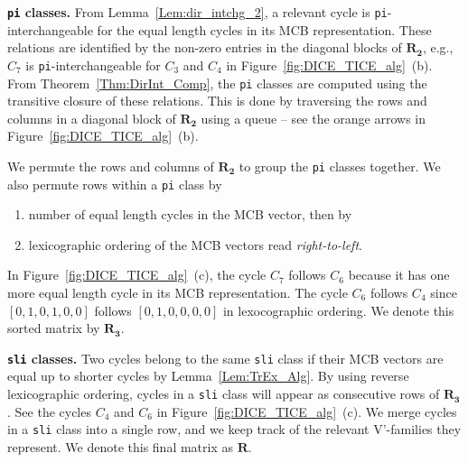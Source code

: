 \documentclass[fleqn,11pt]{article}
\begin{document}
\textbf{{\tt pi} classes.} 
From Lemma~\ref{Lem:dir_intchg_2}, a relevant cycle is {\tt pi}-interchangeable for the equal length cycles in its MCB representation. These relations are identified by the non-zero entries in the diagonal blocks of $\bm{R_2}$, e.g., $C_7$ is {\tt pi}-interchangeable for $C_3$ and $C_4$ in Figure~\ref{fig:DICE_TICE_alg}~(b).
From Theorem~\ref{Thm:DirInt_Comp}, the {\tt pi} classes are computed using the transitive closure of these relations.
This is done by traversing the rows and columns in a diagonal block of $\bm{R_2}$ using a queue -- see the orange arrows in Figure~\ref{fig:DICE_TICE_alg}~(b). %


We permute the rows and columns of $\bm{R_2}$ to group the {\tt pi} classes together.
We also permute rows within a {\tt pi} class by
\begin{enumerate}
	\item number of equal length cycles in the MCB vector, then by
	\item lexicographic ordering of the MCB vectors read \emph{right-to-left}.
\end{enumerate}
In Figure~\ref{fig:DICE_TICE_alg}~(c), the cycle $C_7$ follows $C_6$ because it has one more equal length cycle in its MCB representation. The cycle $C_6$ follows $C_4$ since $[0,1,0,1,0,0]$ follows $[0,1,0,0,0,0]$ in lexocographic ordering. We denote this sorted matrix by $\bm{R_3}$. 

\textbf{{\tt sli} classes.} 
Two cycles belong to the same {\tt sli} class if their MCB vectors are equal up to shorter cycles by Lemma~\ref{Lem:TrEx_Alg}. By using reverse lexicographic ordering, cycles in a {\tt sli} class will appear as consecutive rows of $\bm{R_3}$. See the cycles $C_4$ and $C_6$ in Figure~\ref{fig:DICE_TICE_alg}~(c). We merge cycles in a {\tt sli} class into a single row, and we keep track of the relevant V'-families they represent. We denote this final matrix as $\bm{R}$.
\end{document}
